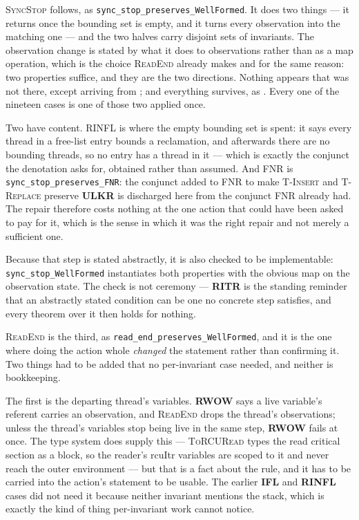 \textsc{SyncStop} follows, as \texttt{sync\_stop\_preserves\_WellFormed}.  It
does two things --- it returns once the bounding set is empty, and it turns
every \unlk{} observation into the matching \frbl{} one --- and the two halves
carry disjoint sets of invariants.  The observation change is stated by what it
does to observations rather than as a map operation, which is the choice
\textsc{ReadEnd} already makes and for the same reason: two properties suffice,
and they are the two directions.  Nothing appears that was not there, except
\frbl{} arriving from \unlk{}; and everything survives, \unlk{} as \frbl{}.
Every one of the nineteen cases is one of those two applied once.

Two have content.  RINFL is where the empty bounding set is spent: it says
every thread in a free-list entry bounds a reclamation, and afterwards there
are no bounding threads, so no entry has a thread in it --- which is exactly the
conjunct the \frbl{} denotation asks for, obtained rather than assumed.  And
FNR is \texttt{sync\_stop\_preserves\_FNR}: the conjunct added to FNR to make
\textsc{T-Insert} and \textsc{T-Replace} preserve \textbf{ULKR} is discharged
here from the conjunct FNR already had.  The repair therefore costs nothing at
the one action that could have been asked to pay for it, which is the sense in
which it was the right repair and not merely a sufficient one.

Because that step is stated abstractly, it is also checked to be
implementable: \texttt{sync\_stop\_WellFormed} instantiates both properties
with the obvious map on the observation state.  The check is not ceremony ---
\textbf{RITR} is the standing reminder that an abstractly stated condition can
be one no concrete step satisfies, and every theorem over it then holds for
nothing.

\textsc{ReadEnd} is the third, as \texttt{read\_end\_preserves\_WellFormed},
and it is the one where doing the action whole \emph{changed} the statement
rather than confirming it.  Two things had to be added that no per-invariant
case needed, and neither is bookkeeping.

The first is the departing thread's variables.  \textbf{RWOW} says a live
variable's referent carries an observation, and \textsc{ReadEnd} drops the
thread's observations; unless the thread's variables stop being live in the
same step, \textbf{RWOW} fails at once.  The type system does supply this ---
\textsc{ToRCURead} types the read critical section as a block, so the reader's
\textsf{rcuItr} variables are scoped to it and never reach the outer
environment --- but that is a fact about the rule, and it has to be carried into
the action's statement to be usable.  The earlier \textbf{IFL} and
\textbf{RINFL} cases did not need it because neither invariant mentions the
stack, which is exactly the kind of thing per-invariant work cannot notice.

